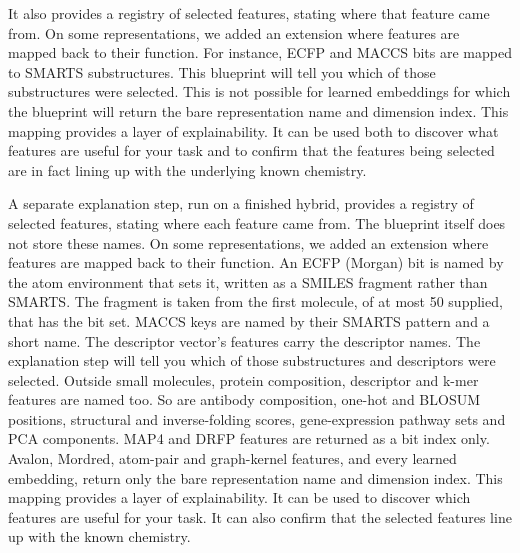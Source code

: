 It also provides a registry of selected features, stating where that feature came from. On some representations, we added an extension where features are mapped back to their function. For instance, ECFP and MACCS bits are mapped to SMARTS substructures. This blueprint will tell you which of those substructures were selected. This is not possible for learned embeddings for which the blueprint will return the bare representation name and dimension index. This mapping provides a layer of explainability. It can be used both to discover what features are useful for your task and to confirm that the features being selected are in fact lining up with the underlying known chemistry.

A separate explanation step, run on a finished hybrid, provides a registry of selected features, stating where each feature came from. The blueprint itself does not store these names. On some representations, we added an extension where features are mapped back to their function. An ECFP (Morgan) bit is named by the atom environment that sets it, written as a SMILES fragment rather than SMARTS. The fragment is taken from the first molecule, of at most 50 supplied, that has the bit set. MACCS keys are named by their SMARTS pattern and a short name. The descriptor vector's features carry the descriptor names. The explanation step will tell you which of those substructures and descriptors were selected. Outside small molecules, protein composition, descriptor and k-mer features are named too. So are antibody composition, one-hot and BLOSUM positions, structural and inverse-folding scores, gene-expression pathway sets and PCA components. MAP4 and DRFP features are returned as a bit index only. Avalon, Mordred, atom-pair and graph-kernel features, and every learned embedding, return only the bare representation name and dimension index. This mapping provides a layer of explainability. It can be used to discover which features are useful for your task. It can also confirm that the selected features line up with the known chemistry.

